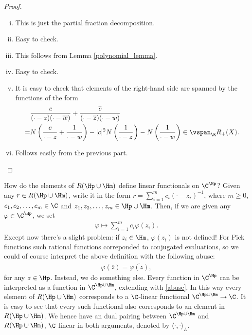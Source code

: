 \begin{proof}
	\begin{enumerate}[(i)]
		\item This is just the partial fraction decomposition.
		\item Easy to check.
		\item This follows from Lemma \ref{polynomial_lemma}.
		\item Easy to check.
		\item It is easy to check that elements of the right-hand side are spanned by the functions of the form
		\begin{align*}
			&\frac{c}{(\cdot - z)(\cdot - \overline{w})} + \frac{\overline{c}}{(\cdot - \overline{z})(\cdot - w)} \\
			=& N\left(\frac{c}{\cdot - z} + \frac{1}{\cdot - w}\right) - |c|^2 N\left(\frac{1}{\cdot - z}\right) - N\left(\frac{1}{\cdot - w}\right) \in \vspan_{\R} R_{+}(X).
		\end{align*}
		\item Follows easily from the previous part.
	\end{enumerate}
\end{proof}

How do the elements of $R(\Hp \cup \Hm)$ define linear functionals on $\C^{\Hp}$? Given any $r \in R(\Hp \cup \Hm)$, write it in the form $r = \sum_{i = 1}^{m} c_{i} (\cdot - z_{i})^{-1}$, where $m \geq 0$, $c_{1}, c_{2}, \ldots, c_{m} \in \C$ and $z_{1}, z_{2}, \ldots, z_{m} \in \Hp \cup \Hm$. Then, if we are given any $\varphi \in \C^{\Hp}$, we set
\begin{align*}
	\varphi \mapsto \sum_{i = 1}^{m} c_{i} \varphi(z_{i}).
\end{align*}
Except now there's a slight problem: if $z_{i} \in \Hm$, $\varphi(z_{i})$ is not defined! For Pick functions such rational functions correponded to conjugated evaluations, so we could of course interpret the above definition with the following abuse:
\begin{align}\label{abuse}
	\varphi(\overline{z}) = \overline{\varphi(z)},
\end{align}
for any $z \in \Hp$. Instead, we do something else. Every function in $\C^{\Hp}$ can be interpreted as a function in $\C^{\Hp \cup \Hm}$, extending with \ref{abuse}. In this way every element of $R(\Hp \cup \Hm)$ corresponds to a $\C$-linear functional $\C^{\Hp \cup \Hm} \to \C$. It is easy to see that every such functional also corresponds to an element in $R(\Hp \cup \Hm)$. We hence have an dual pairing between $\C^{\Hp \cup \Hm}$ and $R(\Hp \cup \Hm)$, $\C$-linear in both arguments, denoted by $\langle \cdot, \cdot \rangle_{L}$.

